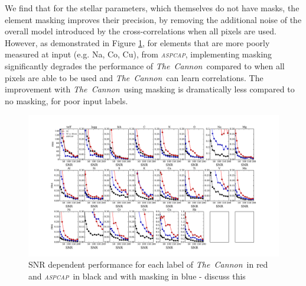 \documentclass[14pt, preprint2]{aastex6}
\newcommand{\project}[1]{\textsl{#1}}
\newcommand{\tc}{\project{The~Cannon}}
\newcommand{\apogee}{\project{\textsc{apogee}}}
\newcommand{\aspcap}{\project{\textsc{aspcap}}}
\begin{document}
We find that for the stellar parameters, which themselves do not have masks, the element masking improves their precision, by removing the additional noise of the overall model introduced by the cross-correlations when all pixels are used. However, as demonstrated in Figure \ref{fig:snr_error}, for elements that are more poorly measured at input (e.g. Na, Co, Cu), from \aspcap, implementing masking significantly degrades the performance of \tc\ compared to when all pixels are able to be used and \tc\ can learn correlations. The improvement with \tc\ using masking is dramatically less compared to no masking, for poor input labels. 








\begin{figure}
\includegraphics[scale=0.45]{rms_snr_both_dr132.pdf} 
  \caption{SNR dependent performance for each label of \tc\ in red and \aspcap\ in black and with masking in blue - discuss this}
\label{fig:snr_error}
\end{figure}


\end{document}

